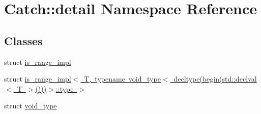 \hypertarget{namespace_catch_1_1detail}{}\section{Catch\+:\+:detail Namespace Reference}
\label{namespace_catch_1_1detail}
\subsection*{Classes}
\begin{DoxyCompactItemize}
\item 
struct \mbox{\hyperlink{struct_catch_1_1detail_1_1is__range__impl}{is\+\_\+range\+\_\+impl}}
\item 
struct \mbox{\hyperlink{struct_catch_1_1detail_1_1is__range__impl_3_01_t_00_01typename_01void__type_3_01decltype_07begin8604ecb9de16ea7789f2f694ac896ffd}{is\+\_\+range\+\_\+impl$<$ T, typename void\+\_\+type$<$ decltype(begin(std\+::declval$<$ T $>$()))$>$\+::type $>$}}
\item 
struct \mbox{\hyperlink{struct_catch_1_1detail_1_1void__type}{void\+\_\+type}}
\end{DoxyCompactItemize}
